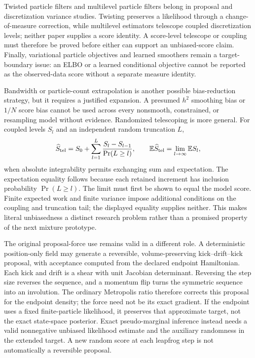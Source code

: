 \documentclass[11pt]{article}
\begin{document}
Twisted particle filters \citep{whiteley2014twisted} and multilevel particle
filters \citep{jasra2017multilevel} belong in proposal and discretization
variance studies. Twisting preserves a likelihood through a change-of-measure
correction, while multilevel estimators telescope coupled discretization
levels; neither paper supplies a score identity. A score-level telescope or
coupling must therefore be proved before either can support an unbiased-score
claim. Finally, variational particle objectives and learned smoothers remain a
target-boundary issue: an ELBO or a learned conditional objective cannot be
reported as the observed-data score without a separate measure identity.

Bandwidth or particle-count extrapolation is another possible bias-reduction
strategy, but it requires a justified expansion. A presumed $h^2$ smoothing
bias or $1/N$ score bias cannot be used across every nonsmooth, constrained,
or resampling model without evidence. Randomized telescoping is more general.
For coupled levels $S_l$ and an independent random truncation $L$,
\begin{equation}
 \widehat S_{\rm tel}
 =S_0+\sum_{l=1}^{L}\frac{S_l-S_{l-1}}{\Pr(L\ge l)},
 \qquad
 \mathbb E\widehat S_{\rm tel}=\lim_{l\to\infty}\mathbb E S_l,
 \label{eq:randomized-telescope}
\end{equation}
when absolute integrability permits exchanging sum and expectation. The
expectation equality follows because each retained increment has inclusion
probability $\Pr(L\ge l)$. The limit must first be shown to equal the model
score. Finite expected work and finite variance impose additional conditions
on the coupling and truncation tail; the displayed equality supplies neither.
This makes literal unbiasedness a distinct research problem rather than a
promised property of the next mixture prototype.

The original proposal-force use remains valid in a different role. A
deterministic position-only field may generate a reversible,
volume-preserving kick--drift--kick proposal, with acceptance computed from
the declared endpoint Hamiltonian. Each kick and drift is a shear with unit
Jacobian determinant. Reversing the step size reverses the sequence, and a
momentum flip turns the symmetric sequence into an involution. The ordinary
Metropolis ratio therefore corrects this proposal for the endpoint density;
the force need not be its exact gradient. If the endpoint uses a fixed
finite-particle likelihood, it preserves that approximate target, not the
exact state-space posterior. Exact pseudo-marginal inference instead needs a
valid nonnegative unbiased likelihood estimate and the auxiliary randomness
in the extended target. A new random score at each leapfrog step is not
automatically a reversible proposal.
\end{document}
